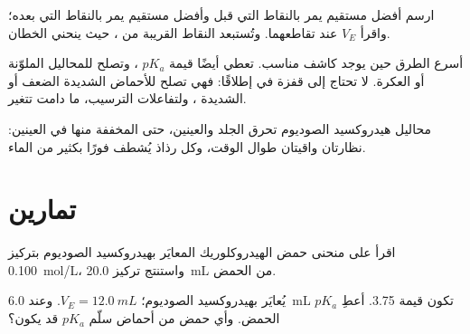 \begin{method}\label{met:g12:ph-conductivity-titrations:two-lines}
ارسم أفضل مستقيم يمر بالنقاط التي قبل 
وأفضل مستقيم يمر بالنقاط التي بعده؛ واقرأ $V_E$ عند
تقاطعهما. وتُستبعد النقاط القريبة من ، حيث ينحني الخطان.
\end{method}

\begin{remark}\label{rem:g12:ph-conductivity-titrations:which}
 أسرع الطرق حين يوجد كاشف مناسب. 
تعطي أيضًا قيمة $pK_a$ ، وتصلح للمحاليل الملوّنة
أو العكرة.  لا تحتاج إلى قفزة في 
إطلاقًا: فهي تصلح للأحماض الشديدة الضعف أو الشديدة ، ولتفاعلات
الترسيب، ما دامت  تتغير.
\end{remark}

\begin{safety}{}
محاليل هيدروكسيد الصوديوم تحرق الجلد والعينين، حتى المخففة منها
في العينين: نظارتان واقيتان طوال الوقت، وكل رذاذ يُشطف فورًا بكثير
من الماء.
\end{safety}

\section{تمارين}


\begin{exercise}[$\star$]\label{exo:g12:ph-conductivity-titrations:1}
اقرأ  على منحنى حمض الهيدروكلوريك المعايَر بهيدروكسيد
الصوديوم بتركيز \qty{0.100}{mol/L}، واستنتج تركيز
\qty{20.0}{mL} من الحمض.
\end{exercise}

\begin{exercise}[$\star$]\label{exo:g12:ph-conductivity-titrations:2}
يُعايَر  بهيدروكسيد الصوديوم؛ $V_E = \qty{12.0}{mL}$. وعند
\qty{6.0}{mL} تكون قيمة  3.75. أعطِ $pK_a$ الحمض. وأي حمض من
أحماض سلّم $pK_a$ قد يكون؟
\end{exercise}

